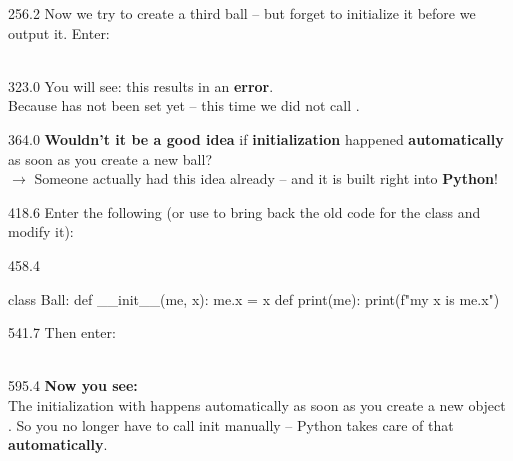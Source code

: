 \documentclass{aslab}
\newcommand*\inp[1]{\makebox[26.4bp][l]{\ttfamily(#1)}}
\newcommand*\codexi[1]{\fontsize{11bp}{#1bp}\ttfamily\lineskiplimit=-\maxdimen}
\begin{document}
\begin{region}[pitch=13.27]{256.2}
Now we try to create a third ball -- but forget to initialize it before we
output it. Enter:\\
\\
\end{region}

\begin{region}[pitch=13.6]{323.0}
You will see: this results in an \textbf{error}.\\
Because  has not been set yet -- this time we did not call
.
\end{region}

\begin{region}[pitch=13.9]{364.0}
\textbf{Wouldn't it be a good idea} if \textbf{initialization} happened
\textbf{automatically} as soon as you create a new ball?\\
$\rightarrow$ Someone actually had this idea already -- and it is built
right into \textbf{Python}!
\end{region}

\begin{region}[pitch=13.2]{418.6}
Enter the following (or use  to bring back the old code for
the class  and modify it):
\end{region}

\begin{region}[pitch=13.2]{458.4}
\begin{codeblock}[basicstyle=\codexi{13.2}]
class Ball:
    def __init__(me, x):
        me.x = x
    def print(me):
        print(f"my x is {me.x}")
\end{codeblock}
\end{region}

\begin{region}[pitch=13.35]{541.7}
Then enter:\\
\inp{1}\\
\inp{2}
\end{region}

\begin{region}[pitch=15.0]{595.4}
\textbf{Now you see:}\\
The initialization with  happens automatically as soon as you
create a new object . So you no longer have to call init
manually -- Python takes care of that \textbf{automatically}.
\end{region}
\end{document}
